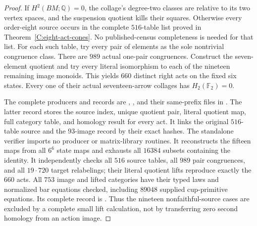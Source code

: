 \begin{proof}
If $H^2(BM;\mathbb Q)=0$, the collage's degree-two classes are
relative to its two vertex spaces, and the suspension quotient
kills their squares.  Otherwise every order-eight source occurs
in the complete $516$-table list proved in
Theorem~\ref{C:eight-act-cones}.  No published-census completeness
is needed for that list.  For each such table, try every pair
of elements as the sole nontrivial congruence class.  There are
$989$ actual one-pair congruences.  Construct the seven-element
quotient and try every literal isomorphism to each of the nineteen
remaining image monoids.  This yields $660$ distinct right acts
on the fixed six states.  Every one of their actual seventeen-arrow
collages has $H_2(\mathbb F_2)=0$.

The complete producers and records are
,
, and their
same-prefix files in .
The latter record stores the source index, unique quotient pair,
literal quotient map, full category table, and homology result
for every act.  It links the original $516$-table source and the
$93$-image record by their exact hashes.
The standalone verifier
 imports no producer
or matrix-library routines.  It reconstructs the fifteen maps
from all $6^6$ state maps and exhausts all $16384$ subsets containing
the identity.  It independently checks all $516$ source tables,
all $989$ pair congruences, and all $19\cdot720$ target relabelings;
their literal quotient lifts reproduce exactly the $660$ acts.
All $753$ image and lifted categories have their typed laws and
normalized bar equations checked, including $89048$ supplied
cup-primitive equations.  Its complete record is
.
Thus the nineteen nonfaithful-source cases are excluded by a
complete small lift calculation, not by transferring zero second
homology from an action image.
\end{proof}

